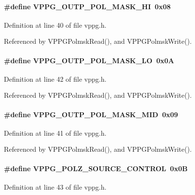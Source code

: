 \paragraph[{VPPG\_\-OUTP\_\-POL\_\-MASK\_\-HI}]{\setlength{\rightskip}{0pt plus 5cm}\#define VPPG\_\-OUTP\_\-POL\_\-MASK\_\-HI~0x08}\hfill\label{vppg_8h_ab5f6eead9e9af4a5fe69b37d93fb6577}


Definition at line 40 of file vppg.h.

Referenced by VPPGPolmskRead(), and VPPGPolmskWrite().
\paragraph[{VPPG\_\-OUTP\_\-POL\_\-MASK\_\-LO}]{\setlength{\rightskip}{0pt plus 5cm}\#define VPPG\_\-OUTP\_\-POL\_\-MASK\_\-LO~0x0A}\hfill\label{vppg_8h_a1b364c91e5cd2cf14a38ca7da104fb03}


Definition at line 42 of file vppg.h.

Referenced by VPPGPolmskRead(), and VPPGPolmskWrite().
\paragraph[{VPPG\_\-OUTP\_\-POL\_\-MASK\_\-MID}]{\setlength{\rightskip}{0pt plus 5cm}\#define VPPG\_\-OUTP\_\-POL\_\-MASK\_\-MID~0x09}\hfill\label{vppg_8h_a5926e2dc12114138b81477b9c564ec6d}


Definition at line 41 of file vppg.h.

Referenced by VPPGPolmskRead(), and VPPGPolmskWrite().
\paragraph[{VPPG\_\-POLZ\_\-SOURCE\_\-CONTROL}]{\setlength{\rightskip}{0pt plus 5cm}\#define VPPG\_\-POLZ\_\-SOURCE\_\-CONTROL~0x0B}\hfill\label{vppg_8h_a1fb21594652b6cb72051487aadb56ada}


Definition at line 43 of file vppg.h.

